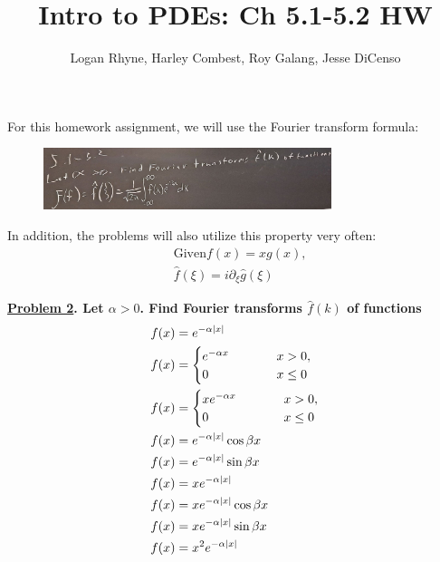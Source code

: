 \documentclass{article}
\title{Intro to PDEs: Ch 5.1-5.2 HW}
\author{Logan Rhyne, Harley Combest, Roy Galang, Jesse DiCenso}
\theoremstyle{definition}
\newenvironment{boldenv}{\bfseries\boldmath}{}
\begin{document}
\maketitle

For this homework assignment, we will use the Fourier transform formula:
\begin{figure}[H]
    \centering
    \includegraphics[width = 0.75\textwidth]{Fourier transform equation.jpeg}
\end{figure}
In addition, the problems will also utilize this property very often:
\begin{align*}
    & \text{Given} f(x) = x g(x),\\
    & \hat{f}(\xi) = i \partial_\xi{\hat{g}(\xi)}
\end{align*}

\begin{boldenv}
    \underline{Problem 2}. Let $\alpha > 0$. Find Fourier transforms $\hat{f}(k)$ of functions \begin{align}
        & f(x)=e^{-\alpha |x|}\\
        & f(x)=\begin{cases}
            e^{-\alpha x} & \mkern 50mu x > 0,\\
            0 & \mkern 50mu x \leq 0
        \end{cases}\\
        & f(x)=\begin{cases}
            x e^{-\alpha x} & \mkern 50mu x > 0,\\
            0 & \mkern 50mu x \leq 0
        \end{cases}\\
        & f(x)=e^{-\alpha |x|} \cos{\beta x}\\
        & f(x)=e^{-\alpha |x|} \sin{\beta x}\\
        & f(x)=x e^{-\alpha |x|}\\
        & f(x)=x e^{-\alpha |x|} \cos{\beta x}\\
        & f(x)=x e^{-\alpha |x|} \sin{\beta x}\\
        & f(x)=x^2 e^{-\alpha |x|}
    \end{align}
\end{boldenv}
\end{document}

